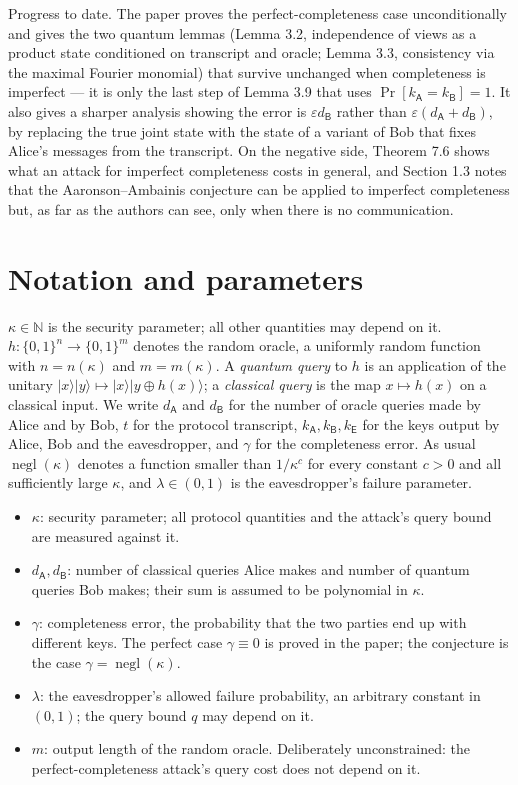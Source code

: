 \documentclass{aicr-conjecture}
\newcommand{\negl}{\operatorname{negl}}
\begin{document}
Progress to date. The paper proves the perfect-completeness case
unconditionally and gives the two quantum lemmas (Lemma 3.2,
independence of views as a product state conditioned on transcript and
oracle; Lemma 3.3, consistency via the maximal Fourier monomial) that
survive unchanged when completeness is imperfect --- it is only the last
step of Lemma 3.9 that uses $\Pr[k_{\mathsf{A}} = k_{\mathsf{B}}] = 1$.
It also gives a sharper analysis showing the error is
$\varepsilon d_{\mathsf{B}}$ rather than
$\varepsilon(d_{\mathsf{A}} + d_{\mathsf{B}})$, by replacing the true
joint state with the state of a variant of Bob that fixes Alice's
messages from the transcript. On the negative side, Theorem 7.6 shows
what an attack for imperfect completeness costs in general, and Section
1.3 notes that the Aaronson--Ambainis conjecture can be applied to
imperfect completeness but, as far as the authors can see, only when
there is no communication.

\section{Notation and parameters}\label{sec:notation}

$\kappa \in \mathbb{N}$ is the security parameter; all other quantities
may depend on it. $h \colon \{0,1\}^{n} \to \{0,1\}^{m}$ denotes the
random oracle, a uniformly random function with $n = n(\kappa)$ and
$m = m(\kappa)$. A \emph{quantum query} to $h$ is an application of the
unitary $|x\rangle|y\rangle \mapsto |x\rangle|y \oplus h(x)\rangle$; a
\emph{classical query} is the map $x \mapsto h(x)$ on a classical input.
We write $d_{\mathsf{A}}$ and $d_{\mathsf{B}}$ for the number of oracle
queries made by Alice and by Bob, $t$ for the protocol transcript,
$k_{\mathsf{A}}, k_{\mathsf{B}}, k_{\mathsf{E}}$ for the keys output by
Alice, Bob and the eavesdropper, and $\gamma$ for the completeness
error. As usual $\negl(\kappa)$ denotes a function smaller than
$1/\kappa^{c}$ for every constant $c > 0$ and all sufficiently large
$\kappa$, and $\lambda \in (0,1)$ is the eavesdropper's failure
parameter.

\begin{itemize}
\item $\kappa$: security parameter; all protocol quantities and the
  attack's query bound are measured against it.
\item $d_{\mathsf{A}}, d_{\mathsf{B}}$: number of classical queries
  Alice makes and number of quantum queries Bob makes; their sum is
  assumed to be polynomial in $\kappa$.
\item $\gamma$: completeness error, the probability that the two parties
  end up with different keys. The perfect case $\gamma \equiv 0$ is
  proved in the paper; the conjecture is the case
  $\gamma = \negl(\kappa)$.
\item $\lambda$: the eavesdropper's allowed failure probability, an
  arbitrary constant in $(0,1)$; the query bound $q$ may depend on it.
\item $m$: output length of the random oracle. Deliberately
  unconstrained: the perfect-completeness attack's query cost does not
  depend on it.
\end{itemize}
\end{document}
